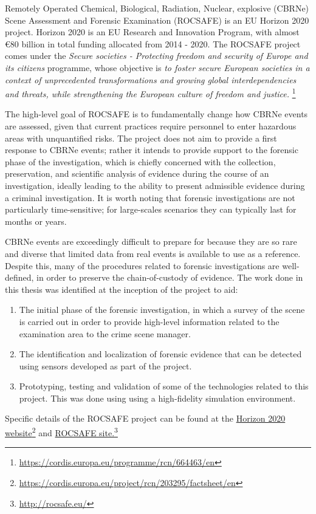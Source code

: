 Remotely Operated Chemical, Biological, Radiation, Nuclear, explosive (CBRNe) Scene Assessment and Forensic Examination (ROCSAFE) is an EU Horizon 2020 project. Horizon 2020 is an EU Research and Innovation Program, with almost €80 billion in total funding allocated from 2014 - 2020. The ROCSAFE project comes under the \textit{Secure societies - Protecting freedom and security of Europe and its citizens} programme, whose objective is \textit{to foster secure European societies in a context of unprecedented transformations and growing global interdependencies and threats, while strengthening the European culture of freedom and justice.}
\href{https://cordis.europa.eu/programme/rcn/664463/en}{}\footnote{\href {https://cordis.europa.eu/programme/rcn/664463/en}{https://cordis.europa.eu/programme/rcn/664463/en}}

The high-level goal of ROCSAFE is to fundamentally change how CBRNe events are assessed, given that current practices require personnel to enter hazardous areas with unquantified risks. The project does not aim to provide a first response to CBRNe events; rather it intends to provide support to the forensic phase of the investigation, which is chiefly concerned with the collection, preservation, and scientific analysis of evidence during the course of an investigation, ideally leading to the ability to present admissible evidence during a criminal investigation. It is worth noting that forensic investigations are not particularly time-sensitive; for large-scales scenarios they can typically last for months or years.\par
CBRNe events are exceedingly difficult to prepare for because they are so rare and diverse that limited data from real events is available to use as a reference. Despite this, many of the procedures related to forensic investigations are well-defined, in order to preserve the chain-of-custody of evidence. The work done in this thesis was identified at the inception of the project to aid: 
\begin{enumerate}
    \item The initial phase of the forensic investigation, in which a survey of the scene is carried out in order to provide high-level information related to the examination area to the crime scene manager.
    \item The identification and localization of forensic evidence that can be detected using sensors developed as part of the project.
    \item Prototyping, testing and validation of some of the technologies related to this project. This was done using using a high-fidelity simulation environment.
\end{enumerate}



Specific details of the ROCSAFE project can be found at the \href{https://cordis.europa.eu/project/rcn/203295/factsheet/en}{Horizon 2020 website}\footnote{\href {https://cordis.europa.eu/project/rcn/203295/factsheet/en}{https://cordis.europa.eu/project/rcn/203295/factsheet/en}} 
and 
\href{http://rocsafe.eu/}{ROCSAFE site.}\footnote{\href {http://rocsafe.eu/}{http://rocsafe.eu/}}